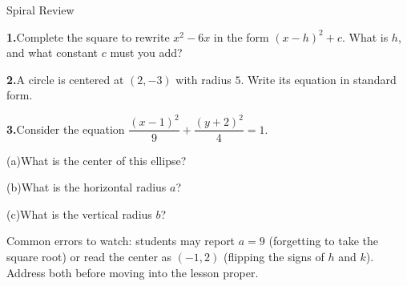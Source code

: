 \documentclass[10pt]{article}
\begin{document}
\namedateperiod

\vspace{0.12in}

\begin{notesbox}{Spiral Review}

\textbf{1.}\quad Complete the square to rewrite $x^2 - 6x$ in the form
$(x - h)^2 + c$. What is $h$, and what constant $c$ must you add?


\vspace{0.06in}

\textbf{2.}\quad A circle is centered at $(2, -3)$ with radius $5$.
Write its equation in standard form.


\vspace{0.06in}

\textbf{3.}\quad Consider the equation
$\dfrac{(x-1)^2}{9} + \dfrac{(y+2)^2}{4} = 1$.

\vspace{4pt}
(a)\quad What is the center of this ellipse?

(b)\quad What is the horizontal radius $a$?

(c)\quad What is the vertical radius $b$?

\end{notesbox}

\begin{teachernote}
Common errors to watch: students may report $a = 9$ (forgetting to take the
square root) or read the center as $(−1, 2)$ (flipping the signs of $h$ and
$k$). Address both before moving into the lesson proper.
\end{teachernote}
\end{document}
